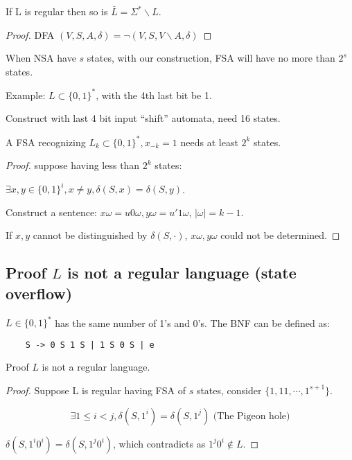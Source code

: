 \begin{corollary}
If L is regular then so is
\(\bar{L} = \Sigma^* \backslash L\).
\end{corollary}

\begin{proof}
DFA \((V,S,A,\delta) = \lnot (V,S,V\backslash A, \delta)\)
\end{proof}

When NSA have \(s\) states, with our construction, FSA will have no more
than \(2^s\) states.

Example: \(L\subset \{0,1\}^*\), with the 4th last bit be 1.

Construct with last 4 bit input ``shift'' automata, need 16 states.

\begin{theorem}
A FSA recognizing \(L_k \subset \{0,1\}^*, x_{-k}=1\) needs at
least $2^k$ states.
\end{theorem}

\begin{proof}
suppose having less than $2^k$ states:


\(\exists x,y \in \{0,1\}^i, x \ne y, \delta(S,x)=\delta(S,y)\).

Construct a sentence: \(x\omega = u0\omega, y\omega = u'1\omega\), \(|\omega|=k-1\). 

If \(x,y\) cannot be distinguished by \(\delta(S,\cdot)\), \(x\omega, y\omega\) could not be determined.
\end{proof}

\subsection{Proof \texorpdfstring{$L$}{L} is not a regular language (state
overflow)}

\(L \in \{0,1\}^*\) has the same number of 1's and 0's. The BNF can be defined as:
\begin{verbatim}
    S -> 0 S 1 S | 1 S 0 S | e
\end{verbatim}

Proof $L$ is not a regular language.
\begin{proof}\label{prf:infinite-states}
Suppose L is regular having FSA of $s$ states, consider
\(\{1, 11,\cdots, 1^{s+1}\}\).

$$\exists 1 \le i < j, \delta(S, 1^i) = \delta(S, 1^j) \text{ (The Pigeon hole)}$$

\(\delta(S, 1^i0^i)=\delta(S, 1^j0^i)\), which contradicts as
\(1^j0^i \not \in L\).
\end{proof}

